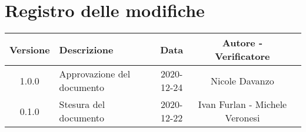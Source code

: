 \section*{Registro delle modifiche}

\begin{center}
	\begin{longtable}{|c|p{5cm}|c|c|c|}
		\hline
		\rowcolor{lighter-grayer}
		\textbf{Versione} & \textbf{Descrizione}             & \textbf{Data} & \textbf{Autore - Verificatore} \\
		\hline
		\endfirsthead


		\hline
		1.0.0 & Approvazione del documento & 2020-12-24 & Nicole Davanzo\\
		0.1.0 & Stesura del documento & 2020-12-22 & Ivan Furlan - Michele Veronesi \\
		\hline
	\end{longtable}
\end{center}